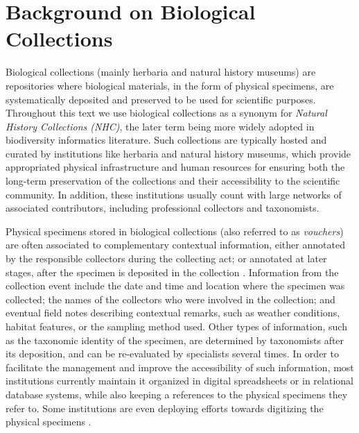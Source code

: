 \chapter{Background on Biological Collections}\label{biodiversity_data}



Biological collections (mainly herbaria and natural history museums) are repositories where biological materials, in the form of physical specimens, are systematically deposited and preserved to be used for scientific purposes. 
Throughout this text we use biological collections as a synonym for \textit{Natural History Collections (NHC)}, the later term being more widely adopted in biodiversity informatics literature.
Such collections are typically hosted and curated by institutions like herbaria and natural history museums, which provide appropriated physical infrastructure and human resources for ensuring both the long-term preservation of the collections and their accessibility to the scientific community.
In addition, these institutions usually count with large networks of associated contributors, including professional collectors and taxonomists.

Physical specimens stored in biological collections (also referred to as \textit{vouchers}) are often associated to complementary contextual information, either annotated by the responsible collectors during the collecting act; or annotated at later stages, after the specimen is deposited in the collection \cite{Chapman2005}. %
Information from the collection event include the date and time and location where the specimen was collected; the names of the collectors who were involved in the collection; and eventual field notes describing contextual remarks, such as weather conditions, habitat features, or the sampling method used.
Other types of information, such as the taxonomic identity of the specimen, are determined by taxonomists after its deposition, and can be re-evaluated by specialists several times.
In order to facilitate the management and improve the accessibility of such information, most institutions currently maintain it organized in digital spreadsheets or in relational database systems, while also keeping a references to the physical specimens they refer to.
Some institutions are even deploying efforts towards digitizing the physical specimens \cite{}.

